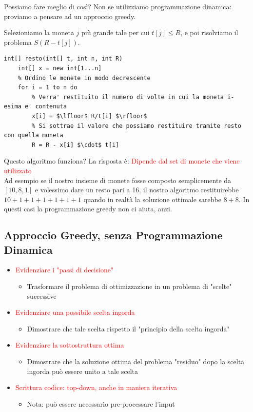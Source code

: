 \documentclass[../cheatSheetAlgoritmi.tex]{subfiles}
\begin{document}
Possiamo fare meglio di così? Non se utilizziamo programmazione dinamica: proviamo a pensare ad un approccio greedy.
\begin{center}
Selezioniamo la moneta $j$ più grande tale per cui $t[j] \leq R$, e poi risolviamo il problema $S(R - t[j])$.
\end{center}
\newpage
\begin{lstlisting}[caption=Resto (Greedy)]
int[] resto(int[] t, int n, int R)
	int[] x = new int[1...n]
	% Ordino le monete in modo decrescente
	for i = 1 to n do
		% Verra' restituito il numero di volte in cui la moneta i-esima e' contenuta
		x[i] = $\lfloor$ R/t[i] $\rfloor$
		% Si sottrae il valore che possiamo restituire tramite resto con quella moneta
		R = R - x[i] $\cdot$ t[i]
\end{lstlisting}
Questo algoritmo funziona? La risposta è: \textcolor{red}{Dipende dal set di monete che viene utilizzato}\\
Ad esempio se il nostro insieme di monete fosse composto semplicemente da $[10, 8, 1]$ e volessimo dare un resto pari a 16, il nostro algoritmo restituirebbe $10 + 1 + 1 + 1+ 1 + 1 + 1$ quando in realtà la soluzione ottimale sarebbe $8 + 8$. In questi casi la programmazione greedy non ci aiuta, anzi.
\subsection{Approccio Greedy, senza Programmazione Dinamica}
\begin{itemize}
	\item \textcolor{red}{Evidenziare i "passi di decisione"}
	\begin{itemize}
		\item Trasformare il problema di ottimizzazione in un problema di
"scelte" successive
	\end{itemize}
	\item \textcolor{red}{Evidenziare una possibile scelta ingorda}
	\begin{itemize}
		\item Dimostrare che tale scelta rispetto il "principio della scelta ingorda"
	\end{itemize}
	\item \textcolor{red}{Evidenziare la sottostruttura ottima}
	\begin{itemize}
		\item Dimostrare che la soluzione ottima del problema "residuo" dopo la
scelta ingorda può essere unito a tale scelta
	\end{itemize}
	\item \textcolor{red}{Scrittura codice: top-down, anche in maniera iterativa}
	\begin{itemize}
		\item Nota: può essere necessario pre-processare l'input
	\end{itemize}
\end{itemize}
\end{document}
